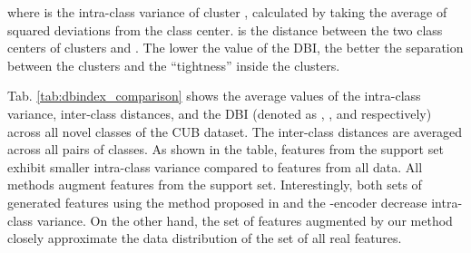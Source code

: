 \documentclass[10pt,twocolumn,letterpaper]{article}
\begin{document}
where  is the intra-class variance of cluster , calculated by taking the average of squared deviations from the class center.
 is the distance between the two class centers of clusters  and .
The lower the value of the DBI, the better the separation between the clusters and the ``tightness'' inside the clusters.


Tab. \ref{tab:dbindex_comparison} shows the average values of the intra-class variance, inter-class distances,  and the DBI (denoted as , , and  respectively) across all novel classes of the CUB dataset. The inter-class distances are averaged across all pairs of classes.
As shown in the table, features from the support set exhibit smaller intra-class variance compared to features from all data. All methods augment features from the support set. 
Interestingly, both  sets of generated features using the method proposed in \cite{feature_transfer} and the -encoder\cite{delta-encoder} decrease intra-class variance. On the other hand, the set of features augmented by our method closely approximate the data distribution of the set of all real features.



\begin{table}[!h] 
    \centering
   \\ 

    \caption{\textbf{Data Distribution analysis for different sets of features}. We augment features using our method and other data generation method based on covariance matrices \cite{feature_transfer} or the -encoder \cite{delta-encoder}. All methods augment features from the support set (first row). 
}
    \label{tab:dbindex_comparison}\end{table} 
\end{document}
